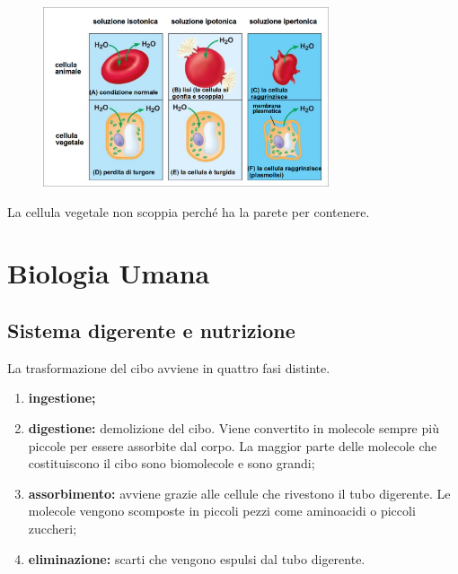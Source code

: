 \documentclass[a4paper]{article}
\begin{document}

\begin{figure}[th]
    \centering
    \includegraphics[width=0.75\textwidth]{./equilibrio_idrico.png}
\end{figure}

La cellula vegetale non scoppia perché ha la parete per contenere.

\pagebreak

\section{Biologia Umana}

\subsection{Sistema digerente e nutrizione}

La trasformazione del cibo avviene in quattro fasi distinte.
\begin{enumerate}
    \item \textbf{ingestione;}
    \item \textbf{digestione:} demolizione del cibo. Viene convertito in molecole sempre più piccole per essere
    assorbite dal corpo. La maggior parte delle molecole che costituiscono il cibo sono
    biomolecole e sono grandi;
    \item \textbf{assorbimento:} avviene grazie alle cellule che rivestono il tubo digerente.
    Le molecole vengono scomposte in piccoli pezzi come aminoacidi o piccoli zuccheri;
    \item \textbf{eliminazione:} scarti che vengono
    espulsi dal tubo digerente.
\end{enumerate}
\end{document}
